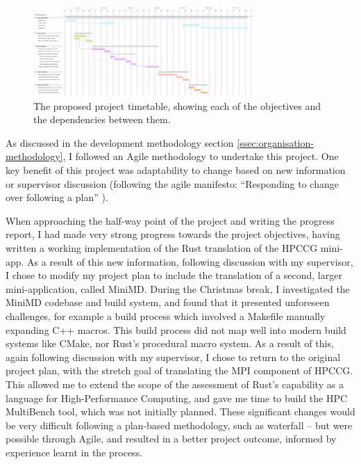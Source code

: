\begin{figure}[h]
    \centering
    \includegraphics[width=0.75\textwidth]{images/6_project_management/diss_gantt_spec_2.png}
    \caption{The proposed project timetable, showing each of the objectives and the dependencies between them.}
    \label{fig:diss_gantt_spec_2}
\end{figure}

As discussed in the development methodology section \ref{ssec:organisation-methodology}, I followed an Agile methodology to undertake this project. One key benefit of this project was adaptability to change based on new information or supervisor discussion (following the agile manifesto: ``Responding to change over following a plan'' \cite{beckManifestoAgileSoftware2001}). 

When approaching the half-way point of the project and writing the progress report, I had made very strong progress towards the project objectives, having written a working implementation of the Rust translation of the HPCCG mini-app. As a result of this new information, following discussion with my supervisor, I chose to modify my project plan to include the translation of a second, larger mini-application, called MiniMD. During the Christmas break, I investigated the MiniMD codebase and build system, and found that it presented unforeseen challenges, for example a build process which involved a Makefile manually expanding C++ macros. This build process did not map well into modern build systems like CMake, nor Rust's procedural macro system. As a result of this, again following discussion with my supervisor, I chose to return to the original project plan, with the stretch goal of translating the MPI component of HPCCG. This allowed me to extend the scope of the assessment of Rust's capability as a language for High-Performance Computing, and gave me time to build the HPC MultiBench tool, which was not initially planned. These significant changes would be very difficult following a plan-based methodology, such as waterfall -- but were possible through Agile, and resulted in a better project outcome, informed by experience learnt in the process.

